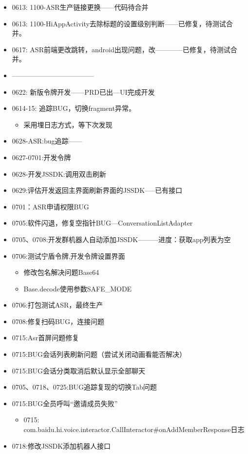\documentclass[12pt,a4paper]{ctexart}
\begin{document}
\begin{itemize}
		\item 0613: 1100-ASR生产链接更换——代码待合并
		\item 0613: 1100-HiAppActivity去除标题的设置级别判断——已修复，待测试合并。
		\item 0617: ASR前端更改跳转，android出现问题，改————已修复，待测试合并。
		\item ————————————
		\item 0622: 新版令牌开发——PRD已出—UI完成开发
		\item 0614-15: 追踪BUG，切换fragment异常。
		\begin{itemize}
			\item 采用埋日志方式，等下次发现
		\end{itemize}
		\item 0628-ASR:bug追踪——
		\item 0627-0701:开发令牌
		\item 0628-开发JSSDK:调用双击刷新
		\item 0629:评估开发返回主界面刷新界面的JSSDK-----已有接口
		\item 0701：ASR申请权限BUG
		\item 0705:软件闪退，修复空指针BUG---ConversationListAdapter
		\item 0705、0708:开发群机器人自动添加JSSDK———进度：获取app列表为空
		\item 0706:测试宁盾令牌,开发令牌设置界面
		\begin{itemize}
			\item 修改包名解决问题Base64
			\item Base.decode使用参数SAFE\_MODE
		\end{itemize}
		\item 0706:打包测试ASR，最终生产
		\item 0708:修复扫码BUG，连接问题
		\item 0715:Asr首屏问题修复
		\item 0715:BUG会话列表刷新问题（尝试关闭动画看能否解决）
		\item 0715:BUG会话分类取消后默认显示全部聊天
		\item 0705、0718、0725:BUG追踪复现的切换Tab问题
		\newline
		\item 0715:BUG全员呼叫“邀请成员失败”
		\begin{itemize}
			\item 0715: com.baidu.hi.voice.interactor.CallInteractor\#onAddMemberResponse日志
		\end{itemize}
		\item 0718:修改JSSDK添加机器人接口

\end{itemize}
\end{document}
